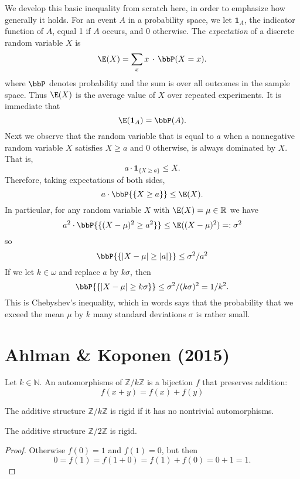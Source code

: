 We develop this basic inequality from scratch here, in order to emphasize how generally it holds. For an event $A$ in a probability space, we let $\mathbf 1_A$, the indicator function of $A$, equal 1 if $A$ occurs, and $0$ otherwise. The \emph{expectation} of a discrete random variable $X$ is 
\[
\E(X)=\sum_x x\,\cdot\,\bbP(X=x).
\]
where $\bbP$ denotes probability and the sum is over all outcomes in the sample space. Thus $\E(X)$ is the average value of $X$ over repeated experiments. It is immediate that
\[
\E (\mathbf 1_{A}) = \bbP(A).
\]
Next we observe that the random variable that is equal to $a$ when a nonnegative random variable $X$ satisfies $X\ge a$ and $0$ otherwise, is always dominated by $X$. That is, 
\[
a\cdot \mathbf 1_{\{X\ge a\}} \le X.
\]
Therefore, taking expectations of both sides,
\[
a\cdot \bbP{\{X\ge a\}} \le \E(X).
\]
In particular, for any random variable $X$ with $\E(X)=\mu\in\mathbb R$ we have 
\[
a^2\cdot \bbP{\{(X-\mu)^2\ge a^2\}} \le \E ((X-\mu)^2)=:\sigma^2
\]
so
\[
\bbP{\{|X-\mu|\ge |a|\}} \le \sigma^2/a^2
\]
If we let $k\in\omega$ and replace $a$ by $k\sigma$, then
\[
\bbP{\{|X-\mu|\ge k\sigma\}} \le \sigma^2/(k\sigma)^2 = 1/k^2.
\]
This is Chebyshev's inequality, which in words says that the probability that we exceed the mean $\mu$ by $k$ many standard deviations $\sigma$ is rather small.

\chapter{Ahlman \& Koponen (2015)}
\begin{definition}
	\label{def:auto}
	\leanok
	Let $k\in\mathbb N$.
	An automorphisms of $\mathbb Z/ k\mathbb Z$ is a bijection $f$ that preserves addition:
	\[
	f(x+y)=f(x)+f(y)
	\]
\end{definition}
\begin{definition}
	\label{def:rigid}
	\leanok
	The additive structure $\mathbb Z/ k\mathbb Z$ is rigid if it has no nontrivial automorphisms.
\end{definition}


\begin{theorem}
	\label{thm:rigid}
	\leanok
	The additive structure $\mathbb Z/ 2\mathbb Z$ is rigid.
\end{theorem}
\begin{proof}
	Otherwise $f(0)=1$ and $f(1)=0$, but then
	\[
	0=f(1)=f(1+0)=f(1)+f(0)=0+1=1.
	\]
\end{proof}


